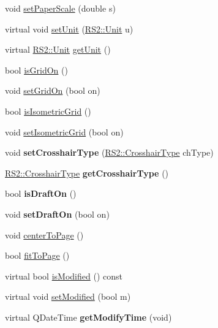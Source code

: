 \begin{DoxyCompactItemize}
\item 
void \hyperlink{classRS__Graphic_a34e884596b42df3a3bd557298d190e8f}{set\-Paper\-Scale} (double s)
\item 
virtual void \hyperlink{classRS__Graphic_a401cec1327c204c7c30a57c6ae27a140}{set\-Unit} (\hyperlink{classRS2_ad859751df6978737e4f35ec111ff9828}{R\-S2\-::\-Unit} u)
\item 
virtual \hyperlink{classRS2_ad859751df6978737e4f35ec111ff9828}{R\-S2\-::\-Unit} \hyperlink{classRS__Graphic_a01b944ec4ed18fd216f42555f513f5fc}{get\-Unit} ()
\item 
bool \hyperlink{classRS__Graphic_a1fd6fa34dc9bcfd15fa7ef246b14f45a}{is\-Grid\-On} ()
\item 
void \hyperlink{classRS__Graphic_a07a4f0675d4bb37953e05073a7e55b9a}{set\-Grid\-On} (bool on)
\item 
bool \hyperlink{classRS__Graphic_a4d3ec30dedb39f6710eb850ca80a2a28}{is\-Isometric\-Grid} ()
\item 
void \hyperlink{classRS__Graphic_a501438cd7650b78622df79e4291c3f0d}{set\-Isometric\-Grid} (bool on)
\item 
\hypertarget{classRS__Graphic_a832512d0ad5837b35c2f39c2a9fc149e}{void {\bfseries set\-Crosshair\-Type} (\hyperlink{classRS2_a6900d729544a78e6cda74f93df772acc}{R\-S2\-::\-Crosshair\-Type} ch\-Type)}\label{classRS__Graphic_a832512d0ad5837b35c2f39c2a9fc149e}

\item 
\hypertarget{classRS__Graphic_ac8f5f4f8df9016ae18c2694cb07be50b}{\hyperlink{classRS2_a6900d729544a78e6cda74f93df772acc}{R\-S2\-::\-Crosshair\-Type} {\bfseries get\-Crosshair\-Type} ()}\label{classRS__Graphic_ac8f5f4f8df9016ae18c2694cb07be50b}

\item 
\hypertarget{classRS__Graphic_a45c766b161849f6efe06f411102f2f2a}{bool {\bfseries is\-Draft\-On} ()}\label{classRS__Graphic_a45c766b161849f6efe06f411102f2f2a}

\item 
\hypertarget{classRS__Graphic_a70841dd196121cedd1eb0d0c70360f8d}{void {\bfseries set\-Draft\-On} (bool on)}\label{classRS__Graphic_a70841dd196121cedd1eb0d0c70360f8d}

\item 
void \hyperlink{classRS__Graphic_aadc989101f3bce49c7b4599c6a9e945c}{center\-To\-Page} ()
\item 
bool \hyperlink{classRS__Graphic_a6844664d70e697a168d06719546a4028}{fit\-To\-Page} ()
\item 
virtual bool \hyperlink{classRS__Graphic_ab46ea774787769ba5ecde9f8025746e7}{is\-Modified} () const 
\item 
virtual void \hyperlink{classRS__Graphic_a03473e425c04214eb54238ed23842900}{set\-Modified} (bool m)
\item 
\hypertarget{classRS__Graphic_a4480e5f60ab409ac8737f8b958600206}{virtual Q\-Date\-Time {\bfseries get\-Modify\-Time} (void)}\label{classRS__Graphic_a4480e5f60ab409ac8737f8b958600206}


\end{DoxyCompactItemize}
